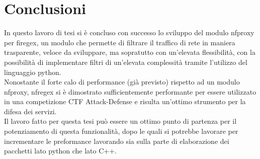 \chapter*{Conclusioni}

In questo lavoro di tesi si è concluso con successo lo sviluppo del modulo nfproxy per firegex, un modulo che permette di filtrare
il traffico di rete in maniera trasparente, veloce da sviluppare, ma sopratutto con un'elevata flessibilità, con la possibilità di implementare
filtri di un'elevata complessità tramite l'utilizzo del linguaggio python.\\

Nonostante il forte calo di performance (già previsto) rispetto ad un modulo nfproxy, nfregex si è dimostrato sufficientemente performante
per essere utilizzato in una competizione CTF Attack-Defense e risulta un'ottimo strumento per la difesa dei servizi.\\

Il lavoro fatto per questa tesi può essere un ottimo punto di partenza per il potenziamento di questa funzionalità, dopo le quali
si potrebbe lavorare per incrementare le preformance lavorando sia sulla parte di elaborazione dei pacchetti lato python che lato C++.